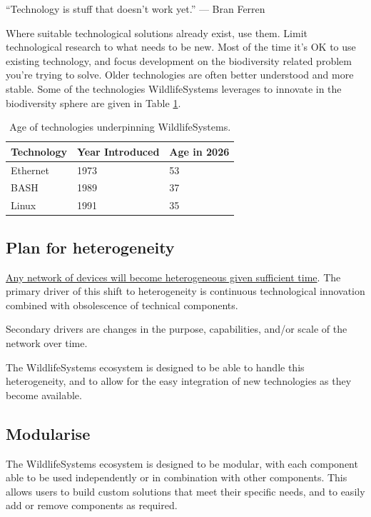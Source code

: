 \documentclass[
]{book}
\begin{document}
``Technology is stuff that doesn't work yet.''
\hfill --- Bran Ferren

Where suitable technological solutions already exist, use them. Limit technological research to what needs to be new. Most of the time it's OK to use existing technology, and focus development on the biodiversity related problem you're trying to solve. Older technologies are often better understood and more stable. Some of the technologies WildlifeSystems leverages to innovate in the biodiversity sphere are given in Table \ref{tab:tech-age}.

\begin{table}

\caption{\label{tab:tech-age}Age of technologies underpinning WildlifeSystems.}
\centering
\begin{tabular}[t]{l|l|l}
\hline
Technology & Year Introduced & Age in  2026\\
\hline
Ethernet & 1973 & 53\\
\hline
BASH & 1989 & 37\\
\hline
Linux & 1991 & 35\\
\hline
\end{tabular}
\end{table}

\subsection{Plan for heterogeneity}\label{plan-for-heterogeneity}

\href{https://medium.ebaker.me.uk/sensor-networks1-abstracting-heterogeneity-319c0c41c9fa}{Any network of devices will become heterogeneous given sufficient time}. The primary driver of this shift to heterogeneity is continuous technological innovation combined with obsolescence of technical components.

Secondary drivers are changes in the purpose, capabilities, and/or scale of the network over time.

The WildlifeSystems ecosystem is designed to be able to handle this heterogeneity, and to allow for the easy integration of new technologies as they become available.

\subsection{Modularise}\label{modularise}

The WildlifeSystems ecosystem is designed to be modular, with each component able to be used independently or in combination with other components. This allows users to build custom solutions that meet their specific needs, and to easily add or remove components as required.
\end{document}
